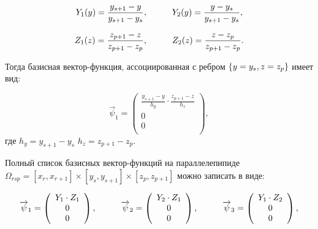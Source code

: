 \begin{equation} \label{eq_1_13}
	Y_1(y) = \frac{y_{s + 1} - y}{y_{s + 1} - y_s}, \hspace{10mm} Y_2(y) = \frac{y - y_s}{y_{s + 1} - y_s},
\end{equation}

\begin{equation} \label{eq_1_14}
	Z_1(z) = \frac{z_{p + 1} - z}{z_{p + 1} - z_p}, \hspace{10mm} Z_2(z) = \frac{z - z_p}{z_{p + 1} - z_p}.
\end{equation}

Тогда базисная вектор-функция, ассоциированная с ребром $\{y = y_s,\\ z = z_p\}$ имеет вид:

\begin{equation*}
	\overrightarrow{\psi}_1 = \left(
	\begin{array}{c}
		\frac{y_{s + 1} - y}{h_y} \cdot \frac{z_{p + 1} - z}{h_z}\\
		0\\
		0\\
	\end{array}
	\right),
\end{equation*}
где $h_y = y_{s + 1} - y_s$ $h_z = z_{p + 1} - z_p$.

Полный список базисных вектор-функций на параллелепипиде $\Omega_{rsp} = [x_r, x_{r+1}] \times [y_s, y_{s+1}] \times [z_p, z_{p+1}]$ можно записать в виде:

\begin{equation*}
	\overrightarrow{\psi}_1 = \left(
\begin{array}{c}
		Y_1 \cdot Z_1\\
		0\\
		0\\
\end{array}
	\right),
	\hspace{10mm}
	\overrightarrow{\psi}_2 = \left(
\begin{array}{c}
	Y_2 \cdot Z_1\\
	0\\
	0\\
\end{array}
\right),
	\hspace{10mm}
	\overrightarrow{\psi}_3 = \left(
\begin{array}{c}
	Y_1 \cdot Z_2\\
	0\\
	0\\
\end{array}
\right),
\end{equation*}

